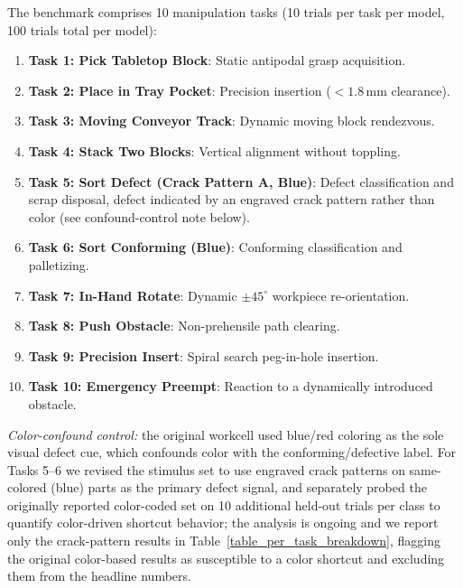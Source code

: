 \documentclass[journal]{IEEEtran}
\begin{document}
The benchmark comprises 10 manipulation tasks (10 trials per task per model, 100 trials total per model):
\begin{enumerate}
    \item \textbf{Task 1: Pick Tabletop Block}: Static antipodal grasp acquisition.
    \item \textbf{Task 2: Place in Tray Pocket}: Precision insertion ($<1.8$\,mm clearance).
    \item \textbf{Task 3: Moving Conveyor Track}: Dynamic moving block rendezvous.
    \item \textbf{Task 4: Stack Two Blocks}: Vertical alignment without toppling.
    \item \textbf{Task 5: Sort Defect (Crack Pattern A, Blue)}: Defect classification and scrap disposal, defect indicated by an engraved crack pattern rather than color (see confound-control note below).
    \item \textbf{Task 6: Sort Conforming (Blue)}: Conforming classification and palletizing.
    \item \textbf{Task 7: In-Hand Rotate}: Dynamic $\pm 45^\circ$ workpiece re-orientation.
    \item \textbf{Task 8: Push Obstacle}: Non-prehensile path clearing.
    \item \textbf{Task 9: Precision Insert}: Spiral search peg-in-hole insertion.
    \item \textbf{Task 10: Emergency Preempt}: Reaction to a dynamically introduced obstacle.
\end{enumerate}
\textit{Color-confound control:} the original workcell used blue/red coloring as the sole visual defect cue, which confounds color with the conforming/defective label. For Tasks 5--6 we revised the stimulus set to use engraved crack patterns on same-colored (blue) parts as the primary defect signal, and separately probed the originally reported color-coded set on 10 additional held-out trials per class to quantify color-driven shortcut behavior; the analysis is ongoing and we report only the crack-pattern results in Table~\ref{table_per_task_breakdown}, flagging the original color-based results as susceptible to a color shortcut and excluding them from the headline numbers.
\end{document}
